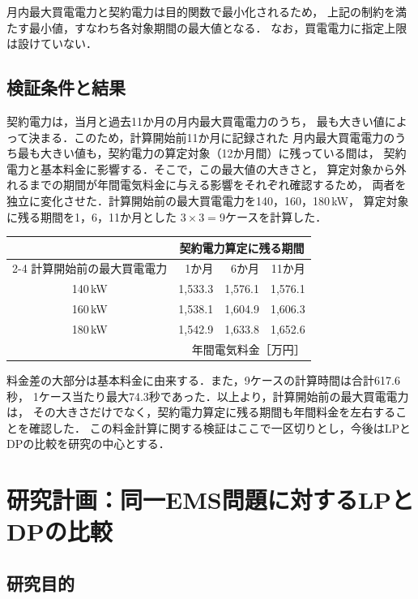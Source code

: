 \documentclass[a4paper,11pt,dvipdfmx]{jsarticle}
\begin{document}
月内最大買電電力と契約電力は目的関数で最小化されるため，
上記の制約を満たす最小値，すなわち各対象期間の最大値となる．
なお，買電電力に指定上限は設けていない．

\subsection{検証条件と結果}

契約電力は，当月と過去11か月の月内最大買電電力のうち，
最も大きい値によって決まる．このため，計算開始前11か月に記録された
月内最大買電電力のうち最も大きい値も，契約電力の算定対象（12か月間）に残っている間は，
契約電力と基本料金に影響する．そこで，この最大値の大きさと，
算定対象から外れるまでの期間が年間電気料金に与える影響をそれぞれ確認するため，
両者を独立に変化させた．計算開始前の最大買電電力を140，160，180\,kW，
算定対象に残る期間を1，6，11か月とした
$3\times3=9$ケースを計算した．

\begin{center}
  \begin{tabular}{c@{\qquad}rrr}
    \toprule
                 & \multicolumn{3}{c}{契約電力算定に残る期間}                     \\
    \cmidrule(lr){2-4}
    計算開始前の最大買電電力 & 1か月                             & 6か月     & 11か月    \\
    \midrule
    140\,kW      & 1,533.3                         & 1,576.1 & 1,576.1 \\
    160\,kW      & 1,538.1                         & 1,604.9 & 1,606.3 \\
    180\,kW      & 1,542.9                         & 1,633.8 & 1,652.6 \\
    \bottomrule
    \multicolumn{4}{r}{\small 年間電気料金［万円］}
  \end{tabular}
\end{center}

料金差の大部分は基本料金に由来する．また，9ケースの計算時間は合計617.6秒，
1ケース当たり最大74.3秒であった．以上より，計算開始前の最大買電電力は，
その大きさだけでなく，契約電力算定に残る期間も年間料金を左右することを確認した．
この料金計算に関する検証はここで一区切りとし，今後はLPとDPの比較を研究の中心とする．

\section{研究計画：同一EMS問題に対するLPとDPの比較}

\subsection{研究目的}
\end{document}
